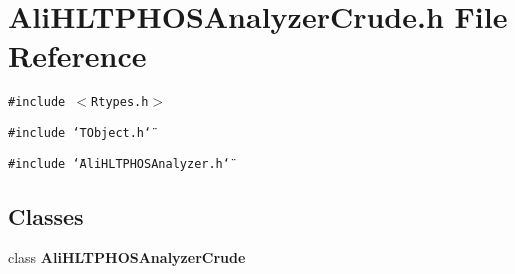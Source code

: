 \section{Ali\-HLTPHOSAnalyzer\-Crude.h File Reference}
\label{AliHLTPHOSAnalyzerCrude_8h}
{\tt \#include $<$Rtypes.h$>$}\par
{\tt \#include \char`\"{}TObject.h\char`\"{}}\par
{\tt \#include \char`\"{}Ali\-HLTPHOSAnalyzer.h\char`\"{}}\par
\subsection*{Classes}
\begin{CompactItemize}
\item 
class {\bf Ali\-HLTPHOSAnalyzer\-Crude}
\end{CompactItemize}
